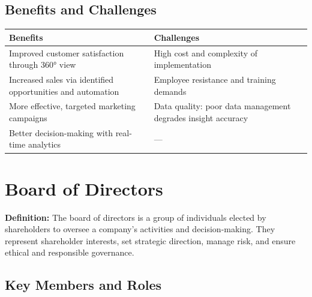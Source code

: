 \documentclass[11pt, letterpaper]{article}
\begin{document}
\subsection{Benefits and Challenges}

\begin{center}
\begin{tabular}{p{6.5cm} p{6.5cm}}
\toprule
\textbf{Benefits} & \textbf{Challenges} \\
\midrule
Improved customer satisfaction through 360° view & High cost and complexity of implementation \\
Increased sales via identified opportunities and automation & Employee resistance and training demands \\
More effective, targeted marketing campaigns & Data quality: poor data management degrades insight accuracy \\
Better decision-making with real-time analytics & --- \\
\bottomrule
\end{tabular}
\end{center}

\newpage

\section{Board of Directors}

\begin{defbox}
\textbf{Definition:} The board of directors is a group of individuals elected by shareholders to oversee a company's activities and decision-making. They represent shareholder interests, set strategic direction, manage risk, and ensure ethical and responsible governance.
\end{defbox}

\subsection{Key Members and Roles}
\end{document}

